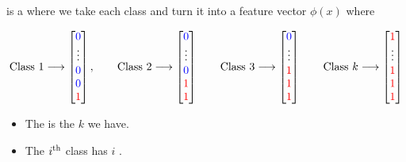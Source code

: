                 \begin{definition}
                     is a  where we take each class and turn it into a feature vector $\phi(x)$ where

                    \begin{equation*}
                    \text{Class 1} \longrightarrow
                    \begin{bmatrix}
                        \textcolor{blue}{0} \\ \vdots \\ \textcolor{blue}{0} \\ \textcolor{blue}{0} \\ \textcolor{red}{1}
                    \end{bmatrix},
                    \qquad 
                    \text{Class 2} \longrightarrow
                    \begin{bmatrix}
                        \textcolor{blue}{0} \\ \vdots \\ \textcolor{blue}{0} \\ \textcolor{red}{1} \\ \textcolor{red}{1}
                    \end{bmatrix}
                    \qquad
                    \text{Class 3} \longrightarrow
                    \begin{bmatrix}
                        \textcolor{blue}{0} \\ \vdots \\ \textcolor{red}{1} \\ \textcolor{red}{1} \\ \textcolor{red}{1}
                    \end{bmatrix}
                    \qquad
                    \text{Class } k \longrightarrow
                    \begin{bmatrix}
                        \textcolor{red}{1} \\ \vdots \\ \textcolor{red}{1} \\ \textcolor{red}{1} \\ \textcolor{red}{1}
                    \end{bmatrix}
                \end{equation*}

                    \begin{itemize}
                        \item The  is the  $k$ we have.
                        \item The $i^{ \text{th} }$ class has $i$ .
                    \end{itemize}


\end{definition}
